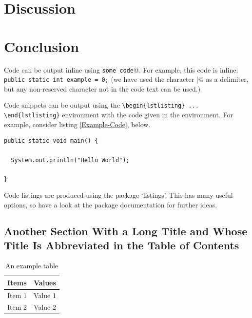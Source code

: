 \documentclass[12pt,a4paper]{report}
\theoremstyle{definition}
\begin{document}
\chapter{Discussion}

\chapter{Conclusion}

Code can be output inline using \verb@\lstinline|some code|@.  For example, this code is inline: \lstinline|public static int example = 0;| (we have used the character \verb@|@ as a delimiter, but any non-reserved character not in the code text can be used.)

Code snippets can be output using the \verb|\begin{lstlisting} ... \end{lstlisting}|
environment with the code given in the environment. For example, consider listing \ref{Example-Code}, below.

\begin{lstlisting}[breaklines,breakatwhitespace,caption={Example code},label=Example-Code]
public static void main() {

  System.out.println("Hello World");

}
\end{lstlisting}

Code listings are produced using the package `listings'.  This has many useful options, so have a look at the package documentation for further ideas.

\section[Short Section Title]{Another Section With a Long Title and Whose Title Is Abbreviated in the Table of Contents}

\begin{table}[htb]
\caption{An example table}
\bigskip
\begin{center}
\label{Example-Table}
\begin{tabular}{|l|l|}
\hline
Items & Values \\
\hline
\hline
Item 1 & Value 1 \\
Item 2 & Value 2 \\
\hline
\end{tabular}
\end{center}
\end{table}
\end{document}
